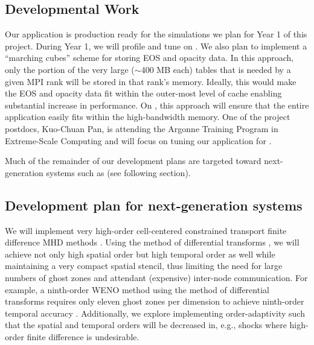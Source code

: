 \subsection{Developmental Work}

Our \sparkmone application is production ready for the simulations we plan for Year 1 of this project.
During Year 1, we will profile and tune \sparkmone on \thet.
We also plan to implement a ``marching cubes'' scheme for storing EOS and opacity data.
In this approach, only the portion of the very large ($\sim$400 MB each) tables that is needed by a given MPI rank will be stored in that rank's memory. Ideally, this would make the EOS and opacity data fit within the outer-most level of cache enabling substantial increase in performance.
On \thet, this approach will ensure that the entire application easily fits within the high-bandwidth memory.
One of the project postdocs, Kuo-Chuan Pan, is attending the Argonne Training Program in Extreme-Scale Computing and will focus on tuning our application for \thet.

Much of the remainder of our development plans are targeted toward next-generation systems such as \aurora (see following section).


\subsection{Development plan for next-generation systems}

We will implement very high-order cell-centered constrained transport finite difference MHD methods \citep{Christlieb:2014, Christlieb:2016}.
Using the method of differential transforms \citep{Norman:2012, Norman:2013, Seal:2014a}, we will achieve not only high spatial order but high temporal order as well while maintaining a very compact spatial stencil, thus limiting the need for large numbers of ghost zones and attendant (expensive) inter-node communication.
For example, a ninth-order WENO method using the method of differential transforms requires only eleven ghost zones per dimension to achieve ninth-order temporal accuracy \citep{Seal:2014a}.
Additionally, we explore implementing order-adaptivity such that the spatial and temporal orders will be decreased in, e.g., shocks where high-order finite difference is undesirable.

